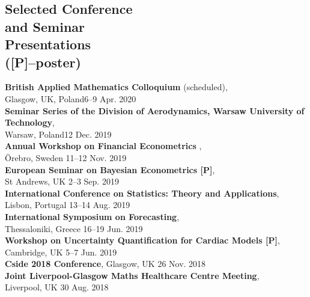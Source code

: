 \documentclass[margin,line]{resume}
\begin{document}
\begin{resume}

\section{\mysidestyle Selected Conference \\and Seminar \\Presentations \\ ([P]--poster)} 
	\textbf{British Applied Mathematics Colloquium} (scheduled),\\
	Glasgow, UK, Poland\hfill  6--9 Apr. 2020 \vspace{1mm} \\
	\textbf{Seminar Series of the Division of Aerodynamics, Warsaw University of Technology},\\
	Warsaw, Poland\hfill 12 Dec. 2019 \vspace{1mm} \\
	\textbf{ Annual Workshop on Financial Econometrics },\\
	{\"O}rebro, Sweden \hfill 11--12 Nov. 2019 \vspace{1mm} \\
	\textbf{ European Seminar on Bayesian Econometrics [P]},\\
	St Andrews, UK \hfill 2--3 Sep. 2019 \vspace{1mm} \\
	\textbf{International Conference on Statistics: Theory and Applications},\\
	Lisbon, Portugal \hfill 13--14 Aug. 2019 \vspace{1mm} \\		
	\textbf{ International Symposium on Forecasting},\\
	Thessaloniki, Greece \hfill 16--19 Jun. 2019 \vspace{1mm} \\	
	\textbf{Workshop on Uncertainty Quantification for Cardiac Models [P]},\\
	Cambridge, UK \hfill 5--7 Jun. 2019 \vspace{1mm} \\		
	\textbf{Cside 2018 Conference}, Glasgow, UK \hfill 26 Nov. 2018 \vspace{1mm} \\
	\textbf{ Joint Liverpool-Glasgow Maths Healthcare Centre Meeting},\\
	Liverpool, UK \hfill 30 Aug. 2018 \vspace{1mm} \\	

\end{resume}
\end{document}
